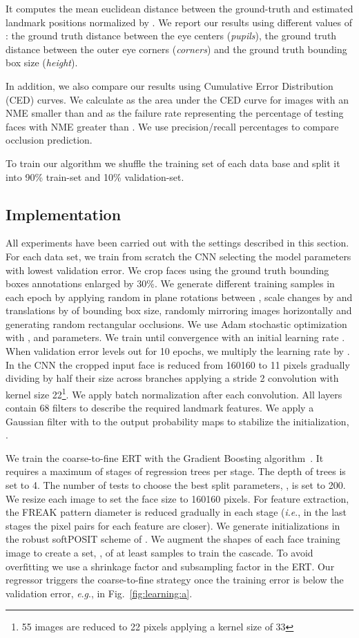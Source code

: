 \documentclass[11pt,twocolumn]{article}
\newcommand{\ie}{\textit{i}.\textit{e}., }
\newcommand{\eg}{\textit{e}.\textit{g}., }
\begin{document}
It computes the mean euclidean distance between the ground-truth and estimated landmark positions normalized by . We report our results using different values of : the ground truth distance between the eye centers (\emph{pupils}), the ground truth distance between the outer eye corners (\emph{corners}) and the ground truth bounding box size (\emph{height}). 

In addition, we also compare our results using Cumulative Error Distribution (CED) curves. We calculate  as the area under the CED curve for images with an NME smaller than  and  as the failure rate representing the percentage of testing faces with NME greater than . We use precision/recall percentages to compare occlusion prediction.

To train our algorithm we shuffle the training set of each data base and split it into 90\% train-set and 10\% validation-set.

\subsection{Implementation}
All experiments have been carried out with the settings described in this section. For each data set, we train from scratch the CNN selecting the model parameters with lowest validation error. We crop faces using the ground truth  bounding boxes annotations enlarged by 30\%. We generate different training samples in each epoch by applying random in plane rotations between , scale changes by  and translations by  of bounding box size, randomly mirroring images horizontally and generating random rectangular occlusions. We use Adam stochastic optimization with ,  and  parameters. We train until convergence with an initial learning rate . When validation error levels out for 10 epochs, we multiply the learning rate by . In the CNN the cropped input face is reduced from 160160 to 11 pixels gradually dividing by half their size across  branches applying a stride 2 convolution with kernel size 22\footnote{55 images are reduced to 22 pixels applying a kernel size of 33}. We apply batch normalization after each convolution. All layers contain 68 filters to describe the required landmark features. We apply a Gaussian filter with  to the output probability maps to stabilize the initialization, .

We train the coarse-to-fine ERT with the Gradient Boosting algorithm~\citep{Hastie09}. It requires a maximum of  stages of  regression trees per stage. The depth of trees is set to 4. The number of tests to choose the best split parameters, , is set to 200. We resize each image to set the face size to 160160 pixels. For feature extraction, the FREAK pattern diameter is reduced gradually in each stage (\ie in the last stages the pixel pairs for each feature are closer). We generate  initializations in the robust softPOSIT scheme of . We augment the shapes of each face training image to create a set, , of at least  samples to train the cascade. To avoid overfitting we use a shrinkage factor  and subsampling factor  in the ERT. Our regressor triggers the coarse-to-fine strategy once the training error is below the validation error, \eg  in Fig.~\ref{fig:learning:a}.
\end{document}
